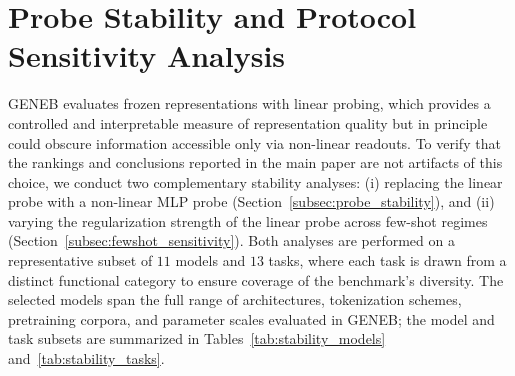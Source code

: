 \documentclass{article}
\theoremstyle{plain}
\theoremstyle{definition}
\theoremstyle{remark}
\begin{document}
\newpage

\section{Probe Stability and Protocol Sensitivity Analysis}
\label{app:probe_stability}

GENEB evaluates frozen representations with linear probing, which provides
a controlled and interpretable measure of representation quality but in
principle could obscure information accessible only via non-linear readouts.
To verify that the rankings and conclusions reported in the main paper are
not artifacts of this choice, we conduct two complementary stability
analyses: (i) replacing the linear probe with a non-linear MLP probe
(Section~\ref{subsec:probe_stability}), and (ii) varying the regularization
strength of the linear probe across few-shot regimes
(Section~\ref{subsec:fewshot_sensitivity}). Both analyses are performed on
a representative subset of $11$ models and $13$ tasks, where each task is
drawn from a distinct functional category to ensure coverage of the
benchmark's diversity. The selected models span the full range of
architectures, tokenization schemes, pretraining corpora, and parameter
scales evaluated in GENEB; the model and task subsets are summarized in
Tables~\ref{tab:stability_models} and~\ref{tab:stability_tasks}.
\end{document}
